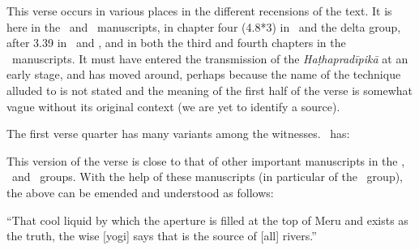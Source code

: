 \begin{ekdosis}
\begin{philcomm}[hp03_049_2]
This verse occurs in various places in the different recensions of the text. It is here in the \alphaTwo\ and \alphaThree\ manuscripts, in chapter four (4.8*3) in \alphaOne\ and the delta group, after 3.39 in \betaOne\ and \betaTwo, and in both the third and fourth chapters in the \textgamma\ manuscripts. It must have entered the transmission of the \emph{Haṭhapradīpikā} at an early stage, and has moved around, perhaps because the name of the technique alluded to is not stated and the meaning of the first half of the verse is somewhat vague without its original context (we are yet to identify a source).

The first verse quarter has many variants among the witnesses. \alphaTwo\ has:
\begin{versinnote}
\end{versinnote}
This version of the verse is close to that of other important manuscripts in the \textbeta, \textgamma\ and \texteta\ groups. With the help of these manuscripts (in particular  of the \textgamma\ group), the above can be emended and understood as follows:
\begin{versinnote}
\tl{°suṣiraṃ ] \getsiglum{K1}, °sukhire \alphaTwo. °mūrdhny ] \getsiglum{P8}. °mūle \alphaTwo. asti tathyaṃ ] \getsiglum{K1}, yad astī \alphaTwo.\\!}
“That cool liquid by which the aperture is filled at the top of Meru and exists as the truth, the wise [yogi] says that is the source of [all] rivers.” 
\end{versinnote}





\end{philcomm}
\end{ekdosis}
